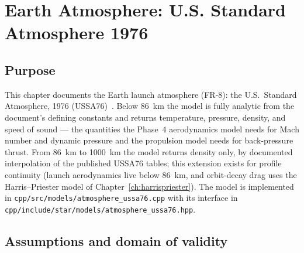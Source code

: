 \chapter{Earth Atmosphere: U.S. Standard Atmosphere 1976}
\label{ch:ussa76}

\section{Purpose}
\label{sec:ussa76:purpose}

This chapter documents the Earth launch atmosphere (FR-8): the
U.S.~Standard Atmosphere, 1976 (USSA76)~\cite{ussa1976}. Below
\qty{86}{\kilo\metre} the model is fully analytic from the document's
defining constants and returns temperature, pressure, density, and speed of
sound --- the quantities the Phase~4 aerodynamics model needs for Mach
number and dynamic pressure and the propulsion model needs for
back-pressure thrust. From \qty{86}{\kilo\metre} to \qty{1000}{\kilo\metre}
the model returns density only, by documented interpolation of the
published USSA76 tables; this extension exists for profile continuity
(launch aerodynamics live below \qty{86}{\kilo\metre}, and orbit-decay drag
uses the Harris--Priester model of Chapter~\ref{ch:harrispriester}). The
model is implemented in \texttt{cpp/src/models/atmosphere\_ussa76.cpp} with
its interface in \texttt{cpp/include/star/models/atmosphere\_ussa76.hpp}.

\section{Assumptions and domain of validity}
\label{sec:ussa76:domain}

